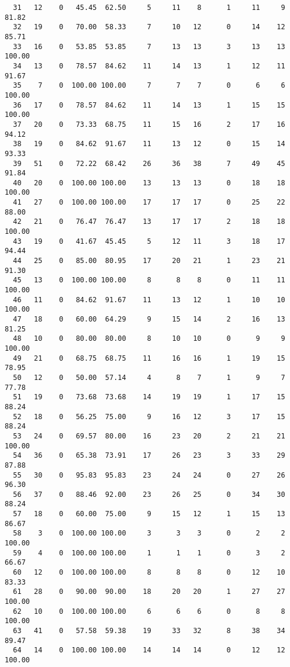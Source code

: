 \begin{verbatim}
  31   12    0   45.45  62.50     5     11    8      1     11     9    81.82
  32   19    0   70.00  58.33     7     10   12      0     14    12    85.71
  33   16    0   53.85  53.85     7     13   13      3     13    13   100.00
  34   13    0   78.57  84.62    11     14   13      1     12    11    91.67
  35    7    0  100.00 100.00     7      7    7      0      6     6   100.00
  36   17    0   78.57  84.62    11     14   13      1     15    15   100.00
  37   20    0   73.33  68.75    11     15   16      2     17    16    94.12
  38   19    0   84.62  91.67    11     13   12      0     15    14    93.33
  39   51    0   72.22  68.42    26     36   38      7     49    45    91.84
  40   20    0  100.00 100.00    13     13   13      0     18    18   100.00
  41   27    0  100.00 100.00    17     17   17      0     25    22    88.00
  42   21    0   76.47  76.47    13     17   17      2     18    18   100.00
  43   19    0   41.67  45.45     5     12   11      3     18    17    94.44
  44   25    0   85.00  80.95    17     20   21      1     23    21    91.30
  45   13    0  100.00 100.00     8      8    8      0     11    11   100.00
  46   11    0   84.62  91.67    11     13   12      1     10    10   100.00
  47   18    0   60.00  64.29     9     15   14      2     16    13    81.25
  48   10    0   80.00  80.00     8     10   10      0      9     9   100.00
  49   21    0   68.75  68.75    11     16   16      1     19    15    78.95
  50   12    0   50.00  57.14     4      8    7      1      9     7    77.78
  51   19    0   73.68  73.68    14     19   19      1     17    15    88.24
  52   18    0   56.25  75.00     9     16   12      3     17    15    88.24
  53   24    0   69.57  80.00    16     23   20      2     21    21   100.00
  54   36    0   65.38  73.91    17     26   23      3     33    29    87.88
  55   30    0   95.83  95.83    23     24   24      0     27    26    96.30
  56   37    0   88.46  92.00    23     26   25      0     34    30    88.24
  57   18    0   60.00  75.00     9     15   12      1     15    13    86.67
  58    3    0  100.00 100.00     3      3    3      0      2     2   100.00
  59    4    0  100.00 100.00     1      1    1      0      3     2    66.67
  60   12    0  100.00 100.00     8      8    8      0     12    10    83.33
  61   28    0   90.00  90.00    18     20   20      1     27    27   100.00
  62   10    0  100.00 100.00     6      6    6      0      8     8   100.00
  63   41    0   57.58  59.38    19     33   32      8     38    34    89.47
  64   14    0  100.00 100.00    14     14   14      0     12    12   100.00

\end{verbatim}
